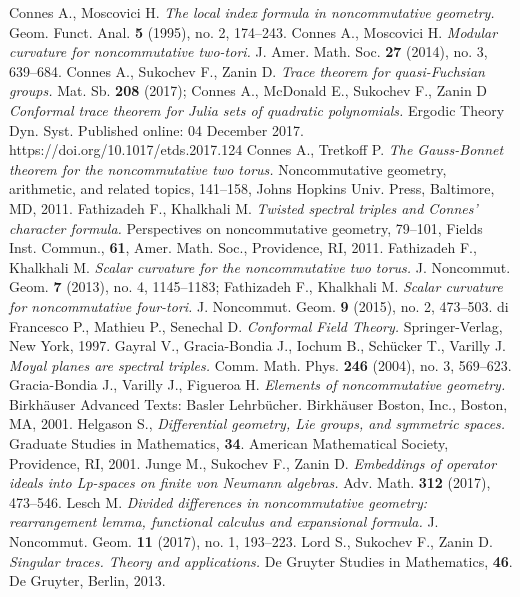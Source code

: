 \documentclass{article}
\begin{document}
\begin{thebibliography}{99}
 Connes A., Moscovici H. {\it The local index formula in noncommutative geometry.} Geom. Funct. Anal. {\bf 5} (1995), no. 2, 174--243.
 Connes A., Moscovici H. {\it Modular curvature for noncommutative two-tori.} J. Amer. Math. Soc. {\bf 27} (2014), no. 3, 639--684.
 Connes A., Sukochev F., Zanin D. {\it Trace theorem for quasi-Fuchsian groups.} Mat. Sb. {\bf 208} (2017); Connes A., McDonald E., Sukochev F., Zanin D {\it Conformal trace theorem for Julia sets of quadratic polynomials.} Ergodic Theory Dyn. Syst. Published online: 04 December 2017. https://doi.org/10.1017/etds.2017.124
 Connes A., Tretkoff P. {\it The Gauss-Bonnet theorem for the noncommutative two torus.} Noncommutative geometry, arithmetic, and related topics, 141--158, Johns Hopkins Univ. Press, Baltimore, MD, 2011.
 Fathizadeh F., Khalkhali M. {\it Twisted spectral triples and Connes' character formula.} Perspectives on noncommutative geometry, 79--101, Fields Inst. Commun., {\bf 61}, Amer. Math. Soc., Providence, RI, 2011.
 Fathizadeh F., Khalkhali M. {\it Scalar curvature for the noncommutative two torus.} J. Noncommut. Geom. {\bf 7} (2013), no. 4, 1145--1183; Fathizadeh F., Khalkhali M. {\it Scalar curvature for noncommutative four-tori.} J. Noncommut. Geom. {\bf 9} (2015), no. 2, 473--503.
 di Francesco P., Mathieu P., Senechal D. {\it Conformal Field Theory.} Springer-Verlag, New York, 1997.
 Gayral V., Gracia-Bondia J., Iochum B., Sch\"ucker T., Varilly J. {\it Moyal planes are spectral triples.} Comm. Math. Phys. {\bf 246} (2004), no. 3, 569--623.
 Gracia-Bondia J., Varilly J., Figueroa H. {\it Elements of noncommutative geometry.} Birkh\"auser Advanced Texts: Basler Lehrb\"ucher. Birkh\"auser Boston, Inc., Boston, MA, 2001.
 Helgason S., {\it Differential geometry, Lie groups, and symmetric spaces.} Graduate Studies in Mathematics, {\bf 34}. American Mathematical Society, Providence, RI, 2001.
 Junge M., Sukochev F., Zanin D. {\it Embeddings of operator ideals into Lp-spaces on finite von Neumann algebras.} Adv. Math. {\bf 312} (2017), 473--546.
 Lesch M. {\it Divided differences in noncommutative geometry: rearrangement lemma, functional calculus and expansional formula.} J. Noncommut. Geom. {\bf 11} (2017), no. 1, 193--223.
 Lord S., Sukochev F., Zanin D. {\it Singular traces. Theory and applications.} De Gruyter Studies in Mathematics, {\bf 46}. De Gruyter, Berlin, 2013.

\end{thebibliography}
\end{document}
